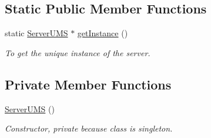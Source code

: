 \subsection*{Static Public Member Functions}
\begin{DoxyCompactItemize}
\item 
\hypertarget{classServerUMS_a5a676fee45bb5f856a6160c61948c5e6}{
static \hyperlink{classServerUMS}{ServerUMS} $\ast$ \hyperlink{classServerUMS_a5a676fee45bb5f856a6160c61948c5e6}{getInstance} ()}
\label{classServerUMS_a5a676fee45bb5f856a6160c61948c5e6}

\begin{DoxyCompactList}\small\item\em To get the unique instance of the server. \item\end{DoxyCompactList}\end{DoxyCompactItemize}
\subsection*{Private Member Functions}
\begin{DoxyCompactItemize}
\item 
\hypertarget{classServerUMS_a89fc4380f08f2cda6044c930d48db2cd}{
\hyperlink{classServerUMS_a89fc4380f08f2cda6044c930d48db2cd}{ServerUMS} ()}
\label{classServerUMS_a89fc4380f08f2cda6044c930d48db2cd}

\begin{DoxyCompactList}\small\item\em Constructor, private because class is singleton. \item\end{DoxyCompactList}\end{DoxyCompactItemize}
